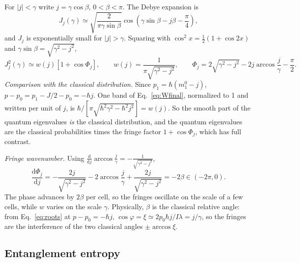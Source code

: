 \documentclass[aps,pra,onecolumn,notitlepage,nofootinbib,11pt]{revtex4-2}
\newcommand{\dd}{\mathrm{d}}
\begin{document}
For $|j|<\gamma$ write $j=\gamma\cos\beta$, $0<\beta<\pi$. The Debye expansion is
\begin{equation}
J_{j}(\gamma)\simeq\sqrt{\frac{2}{\pi\gamma\sin\beta}}\cos\left(\gamma\sin\beta-j\beta-\frac{\pi}{4}\right),
\end{equation}
and $J_{j}$ is exponentially small for $|j|>\gamma$. Squaring with
$\cos^{2}x=\frac12(1+\cos2x)$ and $\gamma\sin\beta=\sqrt{\gamma^{2}-j^{2}}$,
\begin{equation}
J_{j}^{2}(\gamma)\simeq w(j)\left[1+\cos\Phi_{j}\right],\qquad
w(j)=\frac{1}{\pi\sqrt{\gamma^{2}-j^{2}}},\qquad
\Phi_{j}=2\sqrt{\gamma^{2}-j^{2}}-2j\arccos\frac{j}{\gamma}-\frac{\pi}{2}.
\label{eq:Debye}
\end{equation}
\emph{Comparison with the classical distribution.} Since $p_{1}=\hbar(m_{1}^{0}-j)$,
$p-p_{0}=p_{1}-J/2-p_{0}=-\hbar j$. One band of Eq.~\eqref{eq:Wfinal}, normalized to 1
and written per unit of $j$, is $\hbar/[\pi\sqrt{\hbar^{2}\gamma^{2}-\hbar^{2}j^{2}}]=w(j)$.
So the smooth part of the quantum eigenvalues \emph{is} the classical distribution,
and the quantum eigenvalues are the classical probabilities times the fringe factor
$1+\cos\Phi_{j}$, which has full contrast.

\emph{Fringe wavenumber.} Using $\frac{\dd}{\dd j}\arccos\frac{j}{\gamma}=-\frac{1}{\sqrt{\gamma^{2}-j^{2}}}$,
\begin{equation}
\frac{\dd\Phi_{j}}{\dd j}=-\frac{2j}{\sqrt{\gamma^{2}-j^{2}}}-2\arccos\frac{j}{\gamma}
+\frac{2j}{\sqrt{\gamma^{2}-j^{2}}}=-2\beta\in(-2\pi,0).
\end{equation}
The phase advances by $2\beta$ per cell, so the fringes oscillate on the scale of a
few cells, while $w$ varies on the scale $\gamma$. Physically, $\beta$ is the classical
relative angle: from Eq.~\eqref{eq:roots} at $p-p_{0}=-\hbar j$,
$\cos\varphi=\xi\simeq2p_{0}\hbar j/I\lambda=j/\gamma$, so the fringes are the
interference of the two classical angles $\pm\arccos\xi$.

\subsection{Entanglement entropy}
\end{document}
